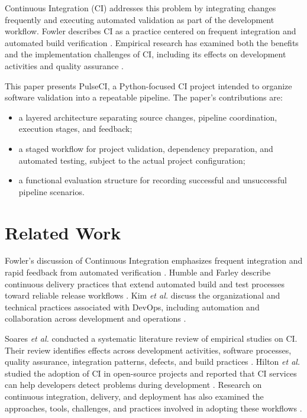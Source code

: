 \documentclass[conference]{IEEEtran}
\begin{document}
Continuous Integration (CI) addresses this problem by integrating changes frequently and executing automated validation as part of the development workflow. Fowler describes CI as a practice centered on frequent integration and automated build verification \cite{fowler}. Empirical research has examined both the benefits and the implementation challenges of CI, including its effects on development activities and quality assurance \cite{soares, hilton}.

This paper presents PulseCI, a Python-focused CI project intended to organize software validation into a repeatable pipeline. The paper's contributions are:
\begin{itemize}
    \item a layered architecture separating source changes, pipeline coordination, execution stages, and feedback;
    \item a staged workflow for project validation, dependency preparation, and automated testing, subject to the actual project configuration;
    \item a functional evaluation structure for recording successful and unsuccessful pipeline scenarios.
\end{itemize}

\section{Related Work}
Fowler's discussion of Continuous Integration emphasizes frequent integration and rapid feedback from automated verification \cite{fowler}. Humble and Farley describe continuous delivery practices that extend automated build and test processes toward reliable release workflows \cite{humble}. Kim \textit{et al.} discuss the organizational and technical practices associated with DevOps, including automation and collaboration across development and operations \cite{kim}.

Soares \textit{et al.} conducted a systematic literature review of empirical studies on CI. Their review identifies effects across development activities, software processes, quality assurance, integration patterns, defects, and build practices \cite{soares}. Hilton \textit{et al.} studied the adoption of CI in open-source projects and reported that CI services can help developers detect problems during development \cite{hilton}. Research on continuous integration, delivery, and deployment has also examined the approaches, tools, challenges, and practices involved in adopting these workflows \cite{shahin}.
\end{document}
